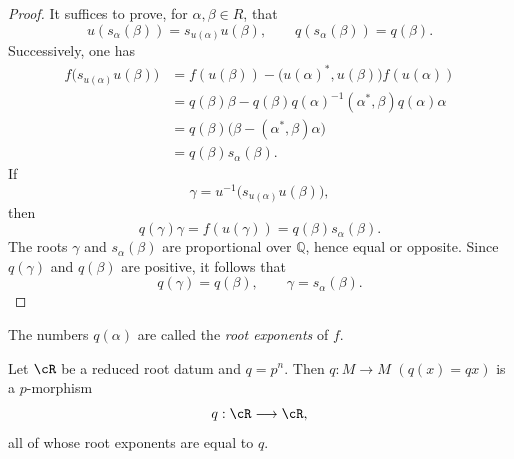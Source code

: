 \begin{proof}
It suffices to prove, for \(\alpha,\beta\in R\), that
\[
 u(s_\alpha(\beta))=s_{u(\alpha)}u(\beta),
 \qquad
 q(s_\alpha(\beta))=q(\beta).
\]
Successively, one has
\begin{align*}
 f\bigl(s_{u(\alpha)}u(\beta)\bigr)
  &=f(u(\beta))
    -\bigl(u(\alpha)^\ast,u(\beta)\bigr)f(u(\alpha))\\
  &=q(\beta)\beta
    -q(\beta)q(\alpha)^{-1}
       (\alpha^\ast,\beta)q(\alpha)\alpha\\
  &=q(\beta)\bigl(\beta-(\alpha^\ast,\beta)\alpha\bigr)\\
  &=q(\beta)s_\alpha(\beta).
\end{align*}
If
\[
 \gamma=u^{-1}\bigl(s_{u(\alpha)}u(\beta)\bigr),
\]
then
\[
 q(\gamma)\gamma=f(u(\gamma))=q(\beta)s_\alpha(\beta).
\]
The roots \(\gamma\) and \(s_\alpha(\beta)\) are proportional over
\(\mathbb Q\), hence equal or opposite. Since \(q(\gamma)\) and
\(q(\beta)\) are positive, it follows that
\[
 q(\gamma)=q(\beta),
 \qquad
 \gamma=s_\alpha(\beta).
\]
\end{proof}

\begin{definition}\label{sga3:XXI:6.8.5}
The numbers \(q(\alpha)\) are called the \emph{root exponents} of
\(f\).
\end{definition}

\begin{example}\label{sga3:XXI:6.8.6}
Let \(\cR\) be a reduced root datum and \(q=p^n\). Then
\(q:M\to M\) \((q(x)=qx)\) is a \(p\)-morphism
\[
 q:\cR\longrightarrow\cR,
\]
all of whose root exponents are equal to \(q\).
\end{example}
